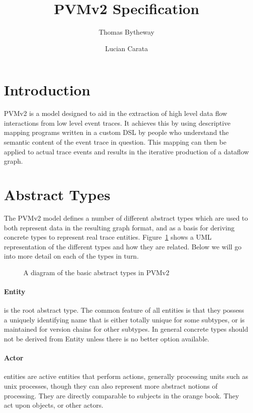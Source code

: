 \documentclass[12pt,twoside,a4paper]{article}
\begin{document}
\title{PVMv2 Specification}
\author{Thomas Bytheway \and Lucian Carata}

\maketitle

\clearpage

\section{Introduction}
PVMv2 is a model designed to aid in the extraction of high level data flow interactions from low level event traces. It achieves this by using descriptive mapping programs written in a custom DSL by people who understand the semantic content of the event trace in question. This mapping can then be applied to actual trace events and results in the iterative production of a dataflow graph.

\section{Abstract Types}
\label{sec:ty}
The PVMv2 model defines a number of different abstract types which are used to both represent data in the resulting graph format, and as a basis for deriving concrete types to represent real trace entities. Figure~\ref{fig:types} shows a UML representation of the different types and how they are related. Below we will go into more detail on each of the types in turn.

\begin{figure}[h]
\centering

\caption{A diagram of the basic abstract types in PVMv2}
\label{fig:types}
\end{figure}

\paragraph{Entity}
\label{sec:ty:entity}
 is the root abstract type. The common feature of all entities is that they possess a uniquely identifying name that is either totally unique for some subtypes, or is maintained for version chains for other subtypes. In general concrete types should not be derived from Entity unless there is no better option available.

\paragraph{Actor}
\label{sec:ty:actor}
 entities are active entities that perform actions, generally processing units such as unix processes, though they can also represent more abstract notions of processing. They are directly comparable to subjects in the orange book. They act upon objects, or other actors.
\end{document}
